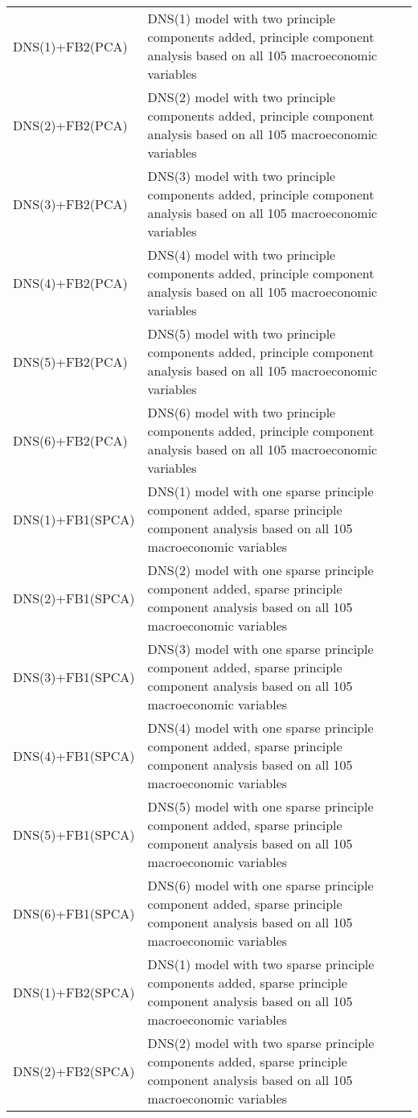\begin{table}[h]
{\begin{tabular}{ll}
DNS(1)+FB2(PCA)           & DNS(1) model with two principle components added, principle component analysis based on all 105 macroeconomic variables \\
DNS(2)+FB2(PCA)           & DNS(2) model with two principle components added, principle component analysis based on all 105 macroeconomic variables \\
DNS(3)+FB2(PCA)           & DNS(3) model with two principle components added, principle component analysis based on all 105 macroeconomic variables \\
DNS(4)+FB2(PCA)           & DNS(4) model with two principle components added, principle component analysis based on all 105 macroeconomic variables \\
DNS(5)+FB2(PCA)           & DNS(5) model with two principle components added, principle component analysis based on all 105 macroeconomic variables \\
DNS(6)+FB2(PCA)           & DNS(6) model with two principle components added, principle component analysis based on all 105 macroeconomic variables \\
DNS(1)+FB1(SPCA)          & DNS(1) model with one sparse principle component added, sparse principle component analysis based on all 105 macroeconomic variables \\
DNS(2)+FB1(SPCA)          & DNS(2) model with one sparse principle component added, sparse principle component analysis based on all 105 macroeconomic variables \\
DNS(3)+FB1(SPCA)          & DNS(3) model with one sparse principle component added, sparse principle component analysis based on all 105 macroeconomic variables \\
DNS(4)+FB1(SPCA)          & DNS(4) model with one sparse principle component added, sparse principle component analysis based on all 105 macroeconomic variables \\
DNS(5)+FB1(SPCA)          & DNS(5) model with one sparse principle component added, sparse principle component analysis based on all 105 macroeconomic variables \\
DNS(6)+FB1(SPCA)          & DNS(6) model with one sparse principle component added, sparse principle component analysis based on all 105 macroeconomic variables \\
DNS(1)+FB2(SPCA)          & DNS(1) model with two sparse principle components added, sparse principle component analysis based on all 105 macroeconomic variables \\
DNS(2)+FB2(SPCA)          & DNS(2) model with two sparse principle components added, sparse principle component analysis based on all 105 macroeconomic variables \\

\end{tabular}}
\end{table}
